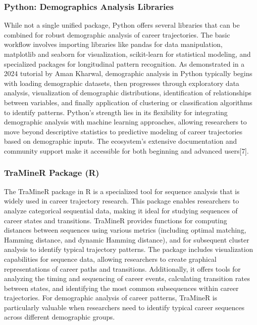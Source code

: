 \documentclass[
  letterpaper,
  DIV=11,
  numbers=noendperiod]{scrartcl}
\begin{document}
\subsubsection{Python: Demographics Analysis
Libraries}\label{python-demographics-analysis-libraries}

While not a single unified package, Python offers several libraries that
can be combined for robust demographic analysis of career trajectories.
The basic workflow involves importing libraries like pandas for data
manipulation, matplotlib and seaborn for visualization, scikit-learn for
statistical modeling, and specialized packages for longitudinal pattern
recognition. As demonstrated in a 2024 tutorial by Aman Kharwal,
demographic analysis in Python typically begins with loading demographic
datasets, then progresses through exploratory data analysis,
visualization of demographic distributions, identification of
relationships between variables, and finally application of clustering
or classification algorithms to identify patterns. Python's strength
lies in its flexibility for integrating demographic analysis with
machine learning approaches, allowing researchers to move beyond
descriptive statistics to predictive modeling of career trajectories
based on demographic inputs. The ecosystem's extensive documentation and
community support make it accessible for both beginning and advanced
users{[}7{]}.

\subsubsection{TraMineR Package (R)}\label{traminer-package-r}

The TraMineR package in R is a specialized tool for sequence analysis
that is widely used in career trajectory research. This package enables
researchers to analyze categorical sequential data, making it ideal for
studying sequences of career states and transitions. TraMineR provides
functions for computing distances between sequences using various
metrics (including optimal matching, Hamming distance, and dynamic
Hamming distance), and for subsequent cluster analysis to identify
typical trajectory patterns. The package includes visualization
capabilities for sequence data, allowing researchers to create graphical
representations of career paths and transitions. Additionally, it offers
tools for analyzing the timing and sequencing of career events,
calculating transition rates between states, and identifying the most
common subsequences within career trajectories. For demographic analysis
of career patterns, TraMineR is particularly valuable when researchers
need to identify typical career sequences across different demographic
groups.
\end{document}
